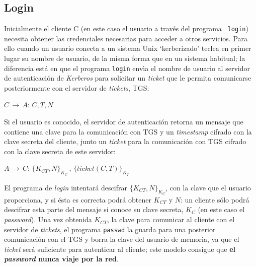 \subsection{Login}
Inicialmente el cliente C (en este caso el usuario a trav\'es del programa {\tt
login}) necesita obtener las
credenciales necesarias para acceder a otros servicios. Para ello 
cuando un usuario conecta a un sistema Unix `kerberizado' teclea en primer 
lugar su nombre de usuario, de la misma forma que en un sistema habitual; la
diferencia est\'a en que el programa {\tt login} env\'{\i}a el nombre de
usuario al servidor de autenticaci\'on de {\it Kerberos} para solicitar un {\it
ticket} que le permita comunicarse posteriormente con el servidor de {\it 
tickets}, TGS:
\begin{center}
$C\,\rightarrow\, A:\, C,T,N$
\end{center}
Si el usuario es conocido, el servidor de autenticaci\'on retorna un mensaje 
que contiene una clave para 
la comunicaci\'on con TGS y un {\it timestamp} cifrado con la clave secreta del 
cliente, junto un {\it ticket} para la comunicaci\'on 
con TGS cifrado con la clave secreta de este servidor:
\begin{center}
$A\,\rightarrow\, C:\,\{K_{CT},N\}_{K_{C}}\, ,\, \{ticket(C,T)\}_{K_{T}}$
\end{center}
El programa de {\it login} intentar\'a descifrar $\{{K_{CT},N}\}_{K_{C}}$, con 
la clave que el usuario proporciona, y si \'esta es correcta podr\'a obtener 
$K_{CT}$ y $N$: un cliente s\'olo podr\'a descifrar esta parte del mensaje si 
conoce su 
clave secreta, $K_{C}$ (en este caso el {\it password}). Una vez obtenida
$K_{CT}$, la clave para comunicar al cliente con el servidor de {\it tickets}, 
el programa {\tt passwd} la guarda para una posterior comunicaci\'on
con el TGS y borra la clave del usuario de memoria, ya que el {\it ticket} 
ser\'a suficiente para autenticar al cliente; este modelo consigue que {\bf el
{\it password} nunca viaje por la red}.
